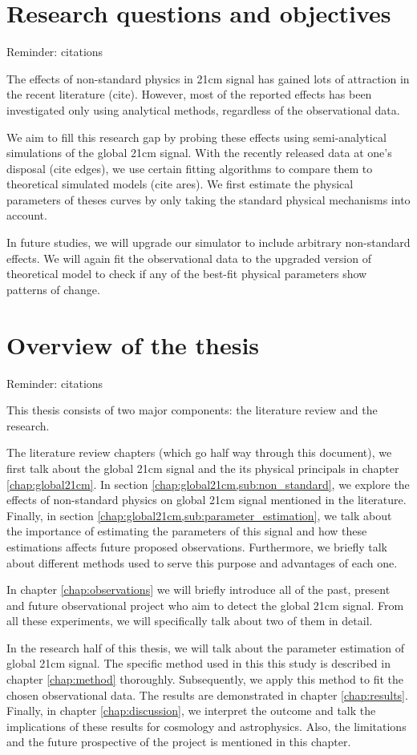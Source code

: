 \documentclass[12pt, TexShade, letterpaper]{report}
\begin{document}
\section{Research questions and objectives}
Reminder: citations \par
The effects of non-standard physics in 21cm signal has gained lots of attraction in the recent literature (cite). However, most of the reported effects has been investigated only using analytical methods, regardless of the observational data.\par
We aim to fill this research gap by probing these effects using semi-analytical simulations of the global 21cm signal. With the recently released data at one's disposal (cite edges), we use certain fitting algorithms to compare them to theoretical simulated models (cite ares). We first estimate the physical parameters of theses curves by only taking the standard physical mechanisms into account.\par
In future studies, we will upgrade our simulator to include arbitrary non-standard effects. We will again fit the observational data to the upgraded version of theoretical model to check if any of the best-fit physical parameters show patterns of change.\par
\section{Overview of the thesis}
Reminder: citations\par
This thesis consists of two major components: the literature review and the research.\par
The literature review chapters (which go half way through this document), we first talk about the global 21cm signal and the its physical principals in chapter \ref{chap:global21cm}. In section \ref{chap:global21cm,sub:non_standard}, we explore the effects of non-standard physics on global 21cm signal mentioned in the literature. Finally, in section \ref{chap:global21cm,sub:parameter_estimation}, we talk about the importance of estimating the parameters of this signal and how these estimations affects future proposed observations. Furthermore, we briefly talk about different methods used to serve this purpose and advantages of each one.\par
In chapter \ref{chap:observations} we will briefly introduce all of the past, present and future observational project who aim to detect the global 21cm signal. From all these experiments, we will specifically talk about two of them in detail.\par
In the research half of this thesis, we will talk about the parameter estimation of global 21cm signal. The specific method used in this this study is described in chapter \ref{chap:method} thoroughly. Subsequently, we apply this method to fit the chosen observational data. The results are demonstrated in chapter \ref{chap:results}. Finally, in chapter \ref{chap:discussion}, we interpret the outcome and talk the implications of these results for cosmology and astrophysics. Also, the limitations and the future prospective of the project is mentioned in this chapter.\par
\end{document}
